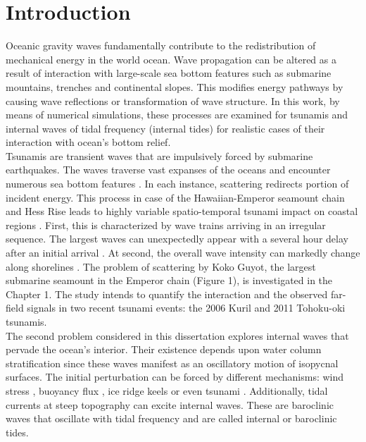 \documentclass[12pt]{article}
\begin{document}
\newpage
\section{Introduction}
Oceanic gravity waves fundamentally contribute to the redistribution of mechanical energy in the 
world ocean. Wave propagation can be altered as a result of interaction with large-scale 
sea bottom features such as submarine mountains, trenches and continental slopes. This 
modifies energy pathways by causing wave reflections or transformation of wave structure. In this 
work, by means of numerical simulations, these processes are examined for tsunamis and internal 
waves of tidal frequency (internal tides) for realistic cases of their interaction with ocean's 
bottom relief.\\
Tsunamis are transient waves that are impulsively forced by submarine earthquakes. The waves 
traverse vast expanses of the oceans and encounter numerous sea bottom features 
\citep{mofjeld2001tsunami}. In each instance, scattering redirects portion of incident energy. This 
process in case of the Hawaiian-Emperor seamount chain and Hess Rise leads to highly variable 
spatio-temporal tsunami impact on coastal regions \citep{kowalik2008kuril, tang2012direct}. First, 
this is characterized by wave trains arriving in an irregular sequence. The largest waves can 
unexpectedly appear with a several hour delay after an initial arrival 
\citep{koshimura2008effect}. At second, the overall wave intensity can markedly change along 
shorelines \citep{Borrero2013}. The problem of scattering by Koko Guyot, the largest submarine 
seamount in the Emperor chain (Figure 1), is investigated in the Chapter 1. The study intends to
quantify the interaction and the observed far-field signals in two recent tsunami events: the 2006 
Kuril and 2011 Tohoku-oki tsunamis.\\
The second problem considered in this dissertation explores internal waves that pervade the ocean's 
interior. Their existence depends upon water column stratification since these waves manifest as an 
oscillatory motion of isopycnal surfaces. The initial perturbation can be forced by different 
mechanisms: wind stress \citep{garrett2001near}, buoyancy flux \citep{garrett1979internal}, ice 
ridge keels \citep{morison1986internal} or even tsunami \citep{santek2007satellite}. Additionally, 
tidal currents at steep topography can excite internal waves. These are baroclinic waves 
that oscillate with tidal frequency and are called internal or baroclinic tides.\\
\end{document}

